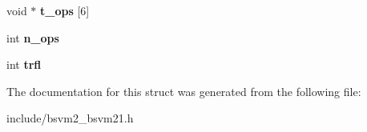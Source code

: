 \begin{DoxyCompactItemize}
\item 
\hypertarget{structBSVM2__Trace__s_a2c3ed6102360716fc20f12736083d1a3}{void $\ast$ {\bfseries t\-\_\-ops} \mbox{[}6\mbox{]}}\label{structBSVM2__Trace__s_a2c3ed6102360716fc20f12736083d1a3}

\item 
\hypertarget{structBSVM2__Trace__s_a32716d50b08f814def587cae218446bd}{int {\bfseries n\-\_\-ops}}\label{structBSVM2__Trace__s_a32716d50b08f814def587cae218446bd}

\item 
\hypertarget{structBSVM2__Trace__s_a5f0176ca68327e7862c0f7255036a3a7}{int {\bfseries trfl}}\label{structBSVM2__Trace__s_a5f0176ca68327e7862c0f7255036a3a7}

\end{DoxyCompactItemize}


The documentation for this struct was generated from the following file\-:\begin{DoxyCompactItemize}
\item 
include/bsvm2\-\_\-bsvm21.\-h\end{DoxyCompactItemize}
